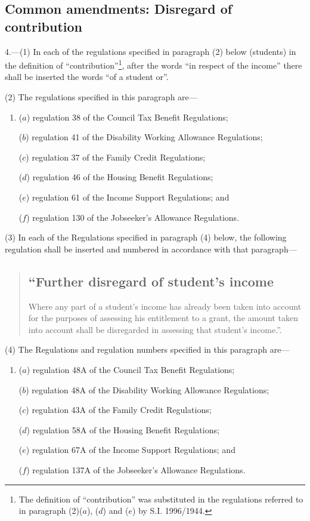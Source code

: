 \documentclass[12pt,a4paper]{article}
\begin{document}
\subsection[4. Common amendments: Disregard of contribution]{Common amendments: Disregard of contribution}

4.---(1)  In each of the regulations specified in paragraph (2) below (students) in the definition of “contribution”\footnote{\frenchspacing The definition of “contribution” was substituted in the regulations referred to in paragraph (2)($a$), ($d$) and ($e$) by S.I. 1996/1944.}, after the words “in respect of the income” there shall be inserted the words “of a student or”.

(2) The regulations specified in this paragraph are—
\begin{enumerate}\item[]
($a$) regulation 38 of the Council Tax Benefit Regulations;

($b$) regulation 41 of the Disability Working Allowance Regulations;

($c$) regulation 37 of the Family Credit Regulations;

($d$) regulation 46 of the Housing Benefit Regulations;

($e$) regulation 61 of the Income Support Regulations; and

($f$) regulation 130 of the Jobseeker’s Allowance Regulations.
\end{enumerate}

(3) In each of the Regulations specified in paragraph (4) below, the following regulation shall be inserted and numbered in accordance with that paragraph—
\begin{quotation}
\subsection*{“Further disregard of student’s income}

Where any part of a student’s income has already been taken into account for the purposes of assessing his entitlement to a grant, the amount taken into account shall be disregarded in assessing that student’s income.”.
\end{quotation}

(4) The Regulations and regulation numbers specified in this paragraph are—
\begin{enumerate}\item[]
($a$) regulation 48A of the Council Tax Benefit Regulations;

($b$) regulation 48A of the Disability Working Allowance Regulations;

($c$) regulation 43A of the Family Credit Regulations;

($d$) regulation 58A of the Housing Benefit Regulations;

($e$) regulation 67A of the Income Support Regulations; and

($f$) regulation 137A of the Jobseeker’s Allowance Regulations.
\end{enumerate}
\end{document}
